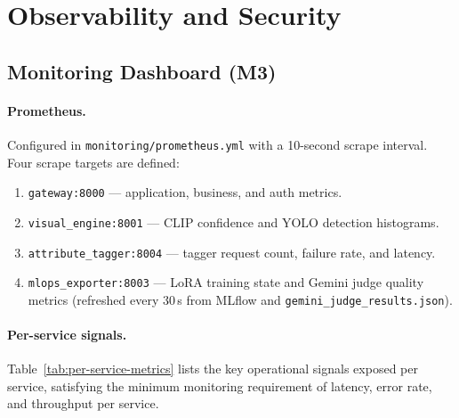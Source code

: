 \documentclass[12pt]{article}
\begin{document}
\section{Observability and Security}

\subsection{Monitoring Dashboard (M3)}

\paragraph{Prometheus.}
Configured in \texttt{monitoring/prometheus.yml} with a 10-second scrape interval. Four scrape targets are defined:

\begin{enumerate}[leftmargin=*]
  \item \texttt{gateway:8000} --- application, business, and auth metrics.
  \item \texttt{visual\_engine:8001} --- CLIP confidence and YOLO detection histograms.
  \item \texttt{attribute\_tagger:8004} --- tagger request count, failure rate, and latency.
  \item \texttt{mlops\_exporter:8003} --- LoRA training state and Gemini judge quality metrics (refreshed every 30\,s from MLflow and \texttt{gemini\_judge\_results.json}).
\end{enumerate}

\paragraph{Per-service signals.} Table~\ref{tab:per-service-metrics} lists the key operational signals exposed per service, satisfying the minimum monitoring requirement of latency, error rate, and throughput per service.
\end{document}
